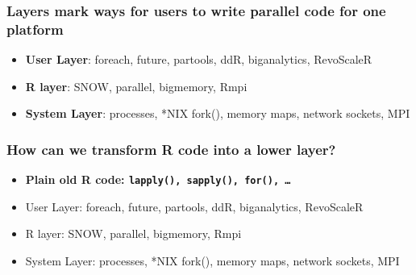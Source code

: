 \documentclass{beamer}
\begin{document}
\begin{frame}

    \frametitle{Layers mark ways for users to write parallel code for one
    platform}

\begin{itemize}
    \item \textbf{User Layer}: foreach, future, partools, ddR, biganalytics, RevoScaleR
    \item \textbf{R layer}: SNOW, parallel, bigmemory, Rmpi
    \item \textbf{System Layer}: processes, *NIX fork(), memory maps, network sockets,
    MPI
\end{itemize}

\end{frame}
\begin{frame}

    \frametitle{How can we transform R code into a lower layer?}

\begin{itemize}
    \item \textbf{Plain old R code: \texttt{lapply(), sapply(), for(), \dots}}
\item User Layer: foreach, future, partools, ddR, biganalytics, RevoScaleR
\item R layer: SNOW, parallel, bigmemory, Rmpi
\item System Layer: processes, *NIX fork(), memory maps, network sockets,
    MPI
\end{itemize}


%
%
%
%
%

\end{frame}
\end{document}
